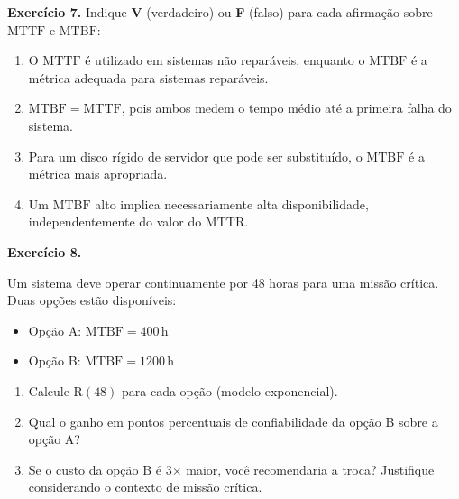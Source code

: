 \documentclass[12pt,a4paper]{article}
\newif\ifgabarito
\newcommand{\R}{\mathrm{R}}
\newcommand{\A}{\mathrm{A}}
\newcommand{\MTTF}{\mathrm{MTTF}}
\newcommand{\MTBF}{\mathrm{MTBF}}
\newcommand{\MTTR}{\mathrm{MTTR}}
\newcommand{\questao}[2][8]{%
  \needspace{#1\baselineskip}%
  \noindent\textbf{Exercício #2.}%
}
\begin{document}
\vspace{8pt}

\questao[10]{7} Indique \textbf{V} (verdadeiro) ou \textbf{F} (falso) para cada afirmação sobre $\MTTF$ e $\MTBF$:
\begin{enumerate}[label=\upshape(\hspace{0.7em})]
  \item O $\MTTF$ é utilizado em sistemas não reparáveis, enquanto o $\MTBF$ é a métrica adequada para sistemas reparáveis.
  \item $\MTBF = \MTTF$, pois ambos medem o tempo médio até a primeira falha do sistema.
  \item Para um disco rígido de servidor que pode ser substituído, o $\MTBF$ é a métrica mais apropriada.
  \item Um $\MTBF$ alto implica necessariamente alta disponibilidade, independentemente do valor do $\MTTR$.
\end{enumerate}

\ifgabarito
\begin{tcolorbox}[gabarito]
(1)~\textbf{V} \quad (2)~\textbf{F} \quad (3)~\textbf{V} \quad (4)~\textbf{F}

\smallskip
(2)~São distintos para sistemas reparáveis.
(4)~$\A = \MTBF/(\MTBF+\MTTR)$; um $\MTTR$ alto pode manter $\A$ baixa mesmo com $\MTBF$ elevado (cf.\ Ex.\ 10, sistema P com $\A \approx 98\%$ apesar de $\MTBF = 800\,\text{h}$).
\end{tcolorbox}
\fi

\vspace{8pt}

\questao[11]{8}
Um sistema deve operar continuamente por 48 horas para uma missão crítica. Duas opções estão disponíveis:
\begin{itemize}[nosep]
  \item Opção A: $\MTBF = 400\,\text{h}$
  \item Opção B: $\MTBF = 1200\,\text{h}$
\end{itemize}
\begin{enumerate}[label=\alph*)]
  \item Calcule $\R(48)$ para cada opção (modelo exponencial).
  \item Qual o ganho em pontos percentuais de confiabilidade da opção B sobre a opção A?
  \item Se o custo da opção B é 3$\times$ maior, você recomendaria a troca? Justifique considerando o contexto de missão crítica.
\end{enumerate}
\end{document}
